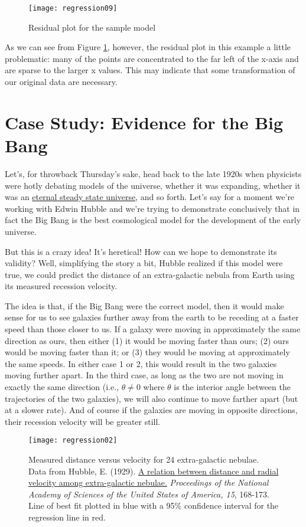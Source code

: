\begin{figure}[htp]
\texttt{[image: regression09]}
\caption{Residual plot for the sample model}
\label{fig:regression09}
\end{figure}

As we can see from Figure \ref{fig:regression09}, however, the residual plot in this example a little problematic: many of the points are concentrated to the far left of the x-axis and are sparse to the larger x values. This may indicate that some transformation of our original data are necessary.

\section{Case Study: Evidence for the Big Bang}

Let's, for throwback Thursday's sake, head back to the late 1920s when physicists were hotly debating models of the universe, whether it was expanding, whether it was an \href{http://en.wikipedia.org/wiki/Steady_state_theory}{eternal steady state universe}, and so forth. Let's say for a moment we're working with Edwin Hubble and we're trying to demonstrate conclusively that in fact the Big Bang is the best cosmological model for the development of the early universe.

But this is a crazy idea! It's heretical! How can we hope to demonstrate its validity? Well, simplifying the story a bit, Hubble realized if this model were true, we could predict the distance of an extra-galactic nebula from Earth using its measured recession velocity.

The idea is that, if the Big Bang were the correct model, then it would make sense for us to see galaxies further away from the earth to be receding at a faster speed than those closer to us. If a galaxy were moving in approximately the same direction as ours, then either (1) it would be moving faster than ours; (2) ours would be moving faster than it; or (3) they would be moving at approximately the same speeds. In either case 1 or 2, this would result in the two galaxies moving further apart. In the third case, as long as the two are not moving in exactly the same direction (i.e., $\theta \neq 0$ where $\theta$ is the interior angle between the trajectories of the two galaxies), we will also continue to move farther apart (but at a slower rate). And of course if the galaxies are moving in opposite directions, their recession velocity will be greater still.

\begin{figure}[htp]
\texttt{[image: regression02]}
\caption{Measured distance versus velocity for 24 extra-galactic nebulae. Data from Hubble, E. (1929). \href{http://www.ncbi.nlm.nih.gov/pmc/articles/PMC522427/}{A relation between distance and radial velocity among extra-galactic nebulae.} \textit{Proceedings of the National Academy of Sciences of the United States of America, 15}, 168-173. Line of best fit plotted in blue with a 95\% confidence interval for the regression line in red.}
\label{fig:regression02}
\end{figure}

